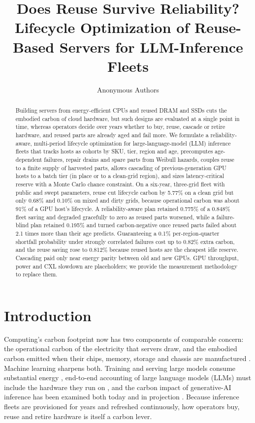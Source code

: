 \documentclass[11pt]{article}
\title{Does Reuse Survive Reliability? Lifecycle Optimization of Reuse-Based Servers for LLM-Inference Fleets}
\author{Anonymous Authors}
\date{}
\begin{document}
\maketitle

\begin{abstract}
Building servers from energy-efficient CPUs and reused DRAM and SSDs cuts the embodied carbon of cloud hardware, but such designs are evaluated at a single point in time, whereas operators decide over years whether to buy, reuse, cascade or retire hardware, and reused parts are already aged and fail more. We formulate a reliability-aware, multi-period lifecycle optimization for large-language-model (LLM) inference fleets that tracks hosts as cohorts by SKU, tier, region and age, precomputes age-dependent failures, repair drains and spare parts from Weibull hazards, couples reuse to a finite supply of harvested parts, allows cascading of previous-generation GPU hosts to a batch tier (in place or to a clean-grid region), and sizes latency-critical reserve with a Monte Carlo chance constraint. On a six-year, three-grid fleet with public and swept parameters, reuse cut lifecycle carbon by 5.77\% on a clean grid but only 0.68\% and 0.10\% on mixed and dirty grids, because operational carbon was about 91\% of a GPU host's lifecycle. A reliability-aware plan retained 0.775\% of a 0.848\% fleet saving and degraded gracefully to zero as reused parts worsened, while a failure-blind plan retained 0.195\% and turned carbon-negative once reused parts failed about 2.1 times more than their age predicts. Guaranteeing a 0.1\% per-region-quarter shortfall probability under strongly correlated failures cost up to 0.82\% extra carbon, and the reuse saving rose to 0.812\% because reused hosts are the cheapest idle reserve. Cascading paid only near energy parity between old and new GPUs. GPU throughput, power and CXL slowdown are placeholders; we provide the measurement methodology to replace them.
\end{abstract}

\section{Introduction}
Computing's carbon footprint now has two components of comparable concern: the operational carbon of the electricity that servers draw, and the embodied carbon emitted when their chips, memory, storage and chassis are manufactured \citep{gupta2022chasing,gupta2022act}. Machine learning sharpens both. Training and serving large models consume substantial energy \citep{strubell2019energy,patterson2021carbon,wu2022sustainableai}, end-to-end accounting of large language models (LLMs) must include the hardware they run on \citep{luccioni2023bloom,faiz2024llmcarbon}, and the carbon impact of generative-AI inference has been examined both today and in projection \citep{chien2023genai}. Because inference fleets are provisioned for years and refreshed continuously, how operators buy, reuse and retire hardware is itself a carbon lever.
\end{document}
